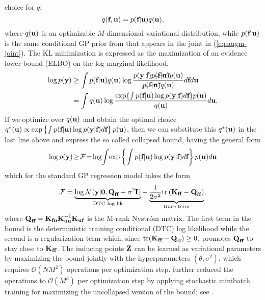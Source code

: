 choice for $q$:
\begin{equation}
q(\textbf{f}, \textbf{u}) 
= p(\textbf{f} | \textbf{u}) q(\textbf{u}), 
\label{eq:pfuqu}
\end{equation}
where $q(\textbf{u})$ is an optimizable $M$-dimensional variational %
distribution,  while $p(\textbf{f} | \textbf{u})$ is the same conditional GP prior from 
that appears in the joint 
in (\ref{eq:augm-joint}). The KL minimization is expressed as the maximization of an evidence lower bound (ELBO) on the log marginal likelihood, 
\begin{align} 
\log p(\textbf{y}) & \geq \int p(\textbf{f} | \textbf{u}) q(\textbf{u}) \log \frac{p(\textbf{y} | \textbf{f}) \cancel{p(\textbf{f} | \textbf{u})} p(\textbf{u})}{\cancel{p(\textbf{f} | \textbf{u})} q(\textbf{u})} d \textbf{f} d \textbf{u} \nonumber \\ 
& = \int q(\textbf{u}) \log \frac{\exp\{ \int p(\textbf{f} | \textbf{u}) \log p(\textbf{y} | \textbf{f}) d \textbf{f}\} p(\textbf{u})}{q(\textbf{u})} d \textbf{u}. \nonumber 
\end{align}
If we optimize over $q(\textbf{u})$ and obtain the optimal choice $q^*(\textbf{u}) \propto \exp\left\{\int p(\textbf{f} | \textbf{u}) \log p(\textbf{y} | \textbf{f}) d \textbf{f} \right\} p(\textbf{u})$, then we can substitute this $q^*(\textbf{u})$ in the last line above and express the 
so called collapsed bound, having the general form 
$$
\log p(\textbf{y}) \! \geq \! \mathcal{F} \! = \! \log \! \int \! \exp\left\{\int p(\textbf{f} | \textbf{u}) \log p(\textbf{y} | \textbf{f}) d \textbf{f} \right\} p(\textbf{u}) d \textbf{u} 
$$
which for the standard GP regression
model takes the form 
\begin{align}
\mathcal{F} = \underbrace{\log \mathcal{N}(\textbf{y} | {\bf 0}, \textbf{Q}_{\textbf{f}\textbf{f}} + \sigma^2 \textbf{I})}_{\text{DTC log lik}} 
- \underbrace{\frac{1}{ 2 \sigma^2} 
\text{tr}\left(  \textbf{K}_{\textbf{f}\textbf{f}} - \textbf{Q}_{\textbf{f}\textbf{f}} \right)}_{\text{trace term}},
\label{eq:collapsedbound_old}
\end{align}
where $\textbf{Q}_{\textbf{f}\textbf{f}} = \textbf{K}_{\textbf{f}\textbf{u}}\textbf{K}_{\textbf{u}\textbf{u}}^{-1}\textbf{K}_{\textbf{u}\textbf{f}}$ is the M-rank Nystr\'om matrix.
The first term in the bound is the deterministic training conditional (DTC) log likelihood \cite{seeger-williams-lawrence-03a, candela-rasmussen-05} 
while the second is a regularization 
term which, since $\text{tr}(  \textbf{K}_{\textbf{f}\textbf{f}} - \textbf{Q}_{\textbf{f}\textbf{f}}) \geq 0$,  promotes $\textbf{Q}_{\textbf{f}\textbf{f}}$ to stay close to  $\textbf{K}_{\textbf{f}\textbf{f}}$. The inducing points $\textbf{Z}$ can be learned as variational parameters by maximizing the bound jointly with the hyperparameters $(\theta, 
\sigma^2)$, which requires 
$\mathcal{O}(N M^2)$ operations per optimization step. \citet{hensman2013gaussian} further reduced the operations to $\mathcal{O}(M^3)$ 
per optimization step by applying stochastic minibatch training for  
maximizing the uncollapsed version of the bound; see  . 

